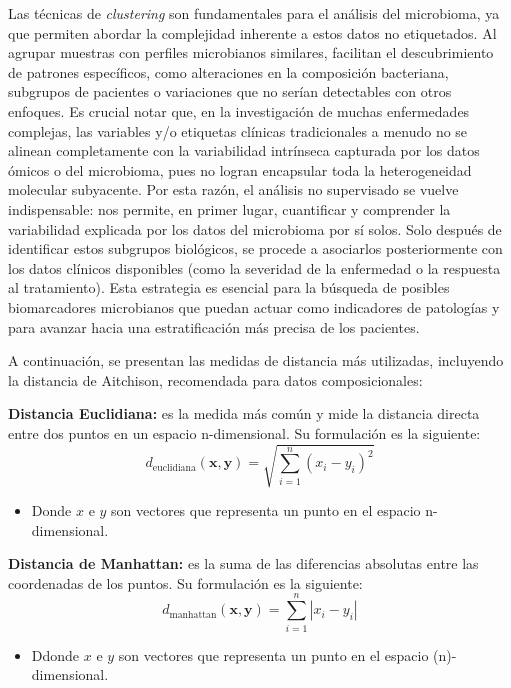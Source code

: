 Las técnicas de \textit{clustering} son fundamentales para el análisis del microbioma, ya que permiten abordar la complejidad inherente a estos datos no etiquetados. Al agrupar muestras con perfiles microbianos similares, facilitan el descubrimiento de patrones específicos, como alteraciones en la composición bacteriana, subgrupos de pacientes o variaciones que no serían detectables con otros enfoques. Es crucial notar que, en la investigación de muchas enfermedades complejas, las variables y/o etiquetas clínicas tradicionales a menudo no se alinean completamente con la variabilidad intrínseca capturada por los datos ómicos o del microbioma, pues no logran encapsular toda la heterogeneidad molecular subyacente. Por esta razón, el análisis no supervisado se vuelve indispensable: nos permite, en primer lugar, cuantificar y comprender la variabilidad explicada por los datos del microbioma por sí solos. Solo después de identificar estos subgrupos biológicos, se procede a asociarlos posteriormente con los datos clínicos disponibles (como la severidad de la enfermedad o la respuesta al tratamiento). Esta estrategia es esencial para la búsqueda de posibles biomarcadores microbianos que puedan actuar como indicadores de patologías y para avanzar hacia una estratificación más precisa de los pacientes.

A continuación, se presentan las medidas de distancia más utilizadas, incluyendo la distancia de Aitchison, recomendada para datos composicionales:


\textbf{Distancia Euclidiana:} es la medida más común y mide la distancia directa entre dos puntos en un espacio n-dimensional. Su formulación es la siguiente:
\begin{equation}
d_{\text{euclidiana}}(\mathbf{x}, \mathbf{y}) = \sqrt{\sum_{i=1}^{n} (x_i - y_i)^2}
\end{equation}
\begin{itemize}
\item Donde $x$ e $y$ son vectores que representa un punto en el espacio n-dimensional.
\end{itemize}

\textbf{Distancia de Manhattan:} es la suma de las diferencias absolutas entre las coordenadas de los puntos. Su formulación es la siguiente:
\begin{equation}
d_{\text{manhattan}}(\mathbf{x}, \mathbf{y}) = \sum_{i=1}^{n} |x_i - y_i|
\end{equation}
\begin{itemize}
\item Ddonde $x$ e $y$ son vectores que representa un punto en el espacio (n)-dimensional.
\end{itemize}

